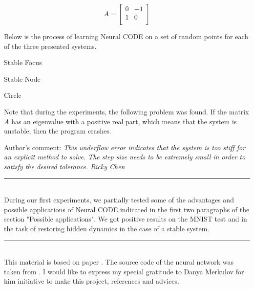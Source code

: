 \documentclass[a0]{a0poster}
\def\Head#1{\noindent{\LARGE\color{bluegray} #1}\bigskip}
\begin{document}
\begin{textblock}{7.0}
\begin{figure}[h]
\begin{center}
\begin{minipage}[h]{0.27\linewidth}
$$ 
A = \begin{bmatrix}
0 & -1 \\
1 & 0 \\
\end{bmatrix}
$$
\end{minipage} 
\end{center}
\end{figure} 

Below is the process of learning Neural CODE on a set of random points for each of the three presented systems.

\begin{center}
\begin{minipage}[h]{0.3\linewidth}
\begin{frame}{Stable Focus}
\end{frame}
\end{minipage}
\hfill
\begin{minipage}[h]{0.3\linewidth}
\begin{frame}{Stable Node}
\end{frame}
\end{minipage}
\hfill
\begin{minipage}[h]{0.3\linewidth}
\begin{frame}{Circle}
\end{frame}
\end{minipage}
\end{center}

Note that during the experiments, the following problem was found. If the matrix $A$ has an eigenvalue  with a positive real part, which means that the system is unstable, then the program crashes.

Author's comment: \textit{This underflow error indicates that the system is too stiff for an explicit method to solve. The step size needs to be extremely small in order to satisfy the desired tolerance. Ricky Chen }

\medskip
\hrule\medskip
\Head{Conclusion}\\
During our first experiments, we partially tested some of the advantages and possible applications of Neural CODE indicated in the first two paragraphs of the section "Possible applications". We got positive results on the MNIST test and in the task of restoring hidden dynamics in the case of a stable system.

\medskip
\hrule\medskip
\Head{Acknowledgements}\\
This material is based on paper \cite{NeuralODE}. The source code of the neural network was taken from \cite{author_git}. I would like to express my special gratitude to Danya Merkulov  for him initiative to make this project, references and advices.


\end{textblock}
\end{document}
